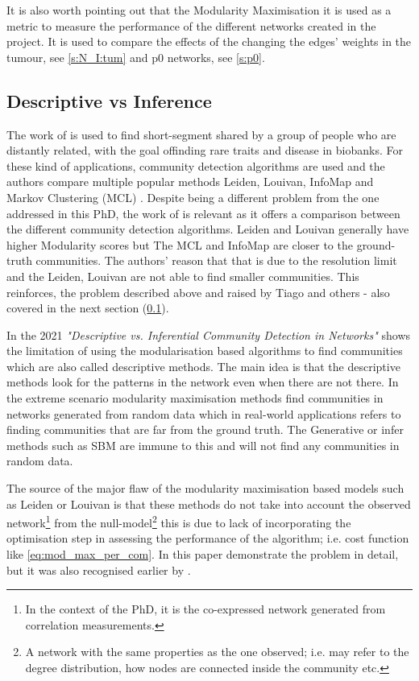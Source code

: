 It is also worth pointing out that the Modularity Maximisation it is used as a metric to measure the performance of the different networks created in the project. It is used to compare the effects of the changing the edges' weights in the tumour, see \cref{s:N_I:tum} and p0 networks, see \cref{s:p0}.


\subsection{Descriptive vs Inference} \label{s:lit:descriptive_inference}

The work of \citet{Shemirani2023-ww} is used to find short-segment shared by a group of people who are distantly related, with the goal offinding rare traits and disease in biobanks. For these kind of applications, community detection algorithms are used and the authors compare multiple popular methods Leiden, Louivan, InfoMap \citet{Rosvall2008-kw} and Markov Clustering (MCL) \citet{Van_Dongen2008-yj}. Despite being a different problem from the one addressed in this PhD, the work of \citet{Shemirani2023-ww} is relevant as it offers a comparison between the different community detection algorithms. Leiden and Louivan generally have higher Modularity scores but The MCL and InfoMap are closer to the ground-truth communities. The authors' reason that that is due to the resolution limit and the Leiden, Louivan are not able to find smaller communities. This reinforces, the problem described above and raised by Tiago \citet{Peixoto2021-jx} and others \cite{Fortunato2007-gh, Traag2019-ne} - also covered in the next section (\cref{s:lit:descriptive_inference}).

In the 2021 \textit{"Descriptive vs. Inferential Community Detection in Networks"} \citet{Peixoto2021-jx} shows the limitation of using the modularisation based algorithms to find communities which are also called descriptive methods. The main idea is that the descriptive methods look for the patterns in the network even when there are not there. In the extreme scenario modularity maximisation methods find communities in networks generated from random data which in real-world applications refers to finding communities that are far from the ground truth. The  Generative or infer methods such as SBM are immune to this and will not find any communities in random data.

The source of the major flaw of the modularity maximisation based models such as Leiden or Louivan is that these methods do not take into account the observed network\footnote{In the context of the PhD, it is the co-expressed network generated from correlation measurements.} from the null-model\footnote{A network with the same properties as the one observed; i.e. may refer to the degree distribution, how nodes are connected inside the community etc.} this is due to lack of incorporating the optimisation step in assessing the performance of the algorithm; i.e. cost function like \cref{eq:mod_max_per_com}. In this paper \citet{Peixoto2021-jx} demonstrate the problem in detail, but it was also recognised earlier by \citet{Guimera2004-gv}.

